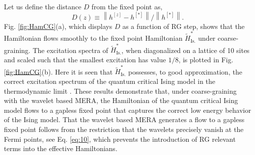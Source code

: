 \documentclass[aps,prl,twocolumn,showpacs,superscriptaddress,floatfix,10pt]{revtex4-1}
\newcommand{\norm}[1]{\mbox{$\left\| #1 \right\|$}}
\begin{document}
Let us define the distance $D$ from the fixed point as, 
\begin{equation}
D(z) \equiv \norm{h^{[z]} - h^{[*]}}/ \norm{h^{[*]}}. \label{eq:D5}
\end{equation}
Fig. \ref{fig:HamCG}(a), which displays $D$ as a function of RG step, shows that the Hamiltonian flows smoothly to the fixed point Hamiltonian $\tilde H_\textrm{Is.}^{*}$ under coarse-graining. The excitation spectra of $\tilde H_\textrm{Is.}^{*}$, when diagonalized on a lattice of 10 sites and scaled such that the smallest excitation has value $1/8$, is plotted in Fig. \ref{fig:HamCG}(b). Here it is seen that $\tilde H_\textrm{Is.}^{*}$ possesses, to good approximation, the correct excitation spectrum of the quantum critical Ising model in the thermodynamic limit \cite{CFTbook1,CFTbook2}. 
These results demonstrate that, under coarse-graining with the wavelet based MERA, the Hamiltonian of the quantum critical Ising model flows to a gapless fixed point that captures the correct low energy behavior of the Ising model. That the wavelet based MERA generates a flow to a gapless fixed point follows from the restriction that the wavelets precisely vanish at the Fermi points, see Eq. \ref{eq:10}, which prevents the introduction of RG relevant terms into the effective Hamiltonians.
\end{document}
